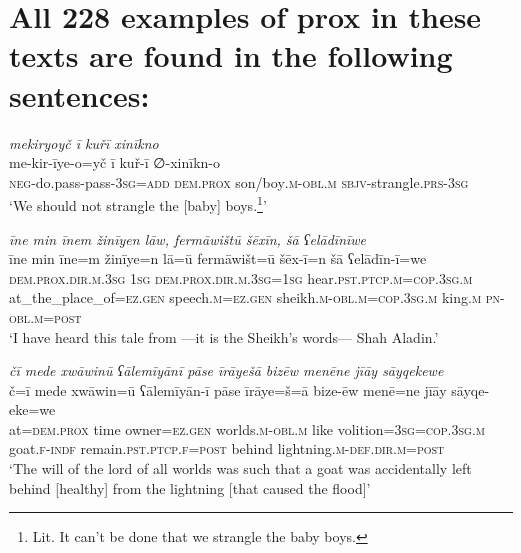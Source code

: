 \chapter{All 228 examples of prox in these texts are found in the following sentences:}

\ea \label{ZB.35}
\textit{mekiryoyč ī kuřī xinīkno} \\ 
\gll me-kir-īye-o=yč ī kuř-ī ∅-xinīkn-o \\ 
 \textsc{neg-}do.pass-pass\textsc{-3sg}\textsc{=add} \textsc{dem.prox} son/boy\textsc{.m}\textsc{-obl}\textsc{.m} \textsc{sbjv}-strangle\textsc{.prs}\textsc{-3sg} \\ 
\glt `We should not strangle the [baby] boys.\footnote{Lit. It can't be done that we strangle the baby boys.}'
\z 
 
\ea \label{ZB.37}
\textit{īne min īnem žinīyen lāw, fermāwištū šēxīn, šā ʕelādīnīwe} \\ 
\gll īne min īne=m žinīye=n lā=ū fermāwišt=ū šēx-ī=n šā ʕelādīn-ī=we \\ 
 \textsc{dem.prox}\textsc{.dir}\textsc{.m}\textsc{.3sg} \textsc{1sg} \textsc{dem.prox}\textsc{.dir}\textsc{.m}\textsc{.3sg}\textsc{=\textsc{1sg}} hear\textsc{.pst}\textsc{.ptcp}\textsc{.m}\textsc{=cop}\textsc{.3sg}\textsc{.m} at\_the\_place\_of\textsc{\textsc{=ez.gen}} speech\textsc{.m}\textsc{\textsc{=ez.gen}} sheikh\textsc{.m}\textsc{-obl}\textsc{.m}\textsc{=cop}\textsc{.3sg}\textsc{.m} king\textsc{.m} \textsc{pn}\textsc{-obl}\textsc{.m}\textsc{=\textsc{post}} \\ 
\glt `I have heard this tale from —it is the Sheikh’s words— Shah Aladin.'
\z 
 
\ea \label{ZB.42}
\textit{čī mede xwāwinū ʕālemīyānī pāse īrāyešā bizēw menēne jīāy sāyqekewe} \\ 
\gll č=ī mede xwāwin=ū ʕālemīyān-ī pāse īrāye=š=ā bize-ēw menē=ne jīāy sāyqe-eke=we \\ 
 at=\textsc{dem.prox} time owner\textsc{\textsc{=ez.gen}} worlds\textsc{.m}\textsc{-obl}\textsc{.m} like volition\textsc{=3sg}\textsc{=cop}\textsc{.3sg}\textsc{.m} goat\textsc{.f}\textsc{-indf} remain\textsc{.pst}\textsc{.ptcp}\textsc{.f}\textsc{=\textsc{post}} behind lightning\textsc{.m}\textsc{-def}\textsc{.dir}\textsc{.m}\textsc{=\textsc{post}} \\ 
\glt `The will of the lord of all worlds was such that a goat was accidentally left behind [healthy] from the lightning [that caused the flood]'
\z 
 
